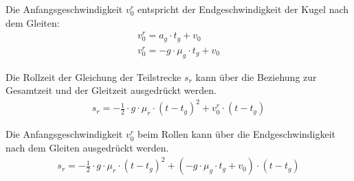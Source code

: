 Die Anfangsgeschwindigkeit $v^r_0$ entspricht der Endgeschwindigkeit der Kugel nach dem Gleiten:
\begin{align}
    v^r_0 = a_g \cdot t_g + v_0\\
    v^r_0 = - g \cdot \mu_g \cdot t_g + v_0
\end{align}

Die Rollzeit der Gleichung der Teilstrecke $s_r$ kann über die Beziehung zur Gesamtzeit und der Gleitzeit ausgedrückt werden.
\begin{align}
    s_r = - \frac{1}{2} \cdot g \cdot \mu_r \cdot (t - t_g)^2 + v^r_0 \cdot (t - t_g)
\end{align}

Die Anfangsgeschwindigkeit $v^r_0$ beim Rollen kann über die Endgeschwindigkeit nach dem Gleiten ausgedrückt werden.
\begin{align}
    s_r = - \frac{1}{2} \cdot g \cdot \mu_r \cdot (t - t_g)^2 + (-g \cdot \mu_g \cdot t_g + v_0) \cdot (t - t_g)
\end{align}

